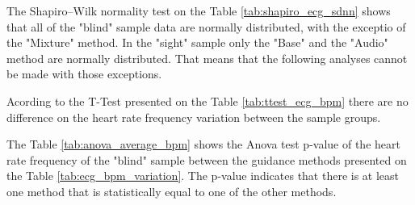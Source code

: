 
%
%    
%
%
%
%
%    
%
The Shapiro–Wilk normality test on the Table \ref{tab:shapiro_ecg_sdnn} shows that all of the "blind" sample data are normally distributed, with the exceptio of the "Mixture" method. In the "sight" sample only the "Base" and the "Audio" method are normally distributed. That means that the following analyses cannot be made with those exceptions.

%

Acording to the T-Test presented on the Table \ref{tab:ttest_ecg_bpm} there are no difference on the heart rate frequency variation between the sample groups.

%

\begin{table}[!htb]
    \begin{minipage}{.45\linewidth}
        
    \end{minipage}
    \hfill
    \begin{minipage}{.45\linewidth}
        \vspace{-2.75cm}
        
    \end{minipage}
\end{table}

The Table \ref{tab:anova_average_bpm} shows the Anova test p-value of the heart rate frequency of the "blind" sample between the guidance methods presented on the Table \ref{tab:ecg_bpm_variation}. The p-value indicates that there is at least one method that is statistically equal to one of the other methods.

